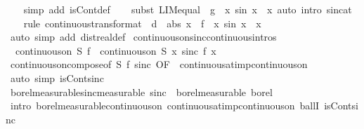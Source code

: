 \documentclass[leqno]{article}
\theoremstyle{definition}
\begin{document}
\begin{isabellebody}
\ \ \isamarkupfalse%
\ {\isacharparenleft}simp\ add{\isacharcolon}\ isCont{\isacharunderscore}def{\isacharparenright}\isanewline
\ \ \isamarkupfalse%
\ {\isacharparenleft}subst\ LIM{\isacharunderscore}equal\ {\isacharbrackleft}\ g\ {\isacharequal}\ {\isachardoublequoteopen}{\isasymlambda}x{\isachardot}\ sin\ x\ {\isacharslash}\ x{\isachardoublequoteclose}{\isacharbrackright}{\isacharcomma}\ auto\ intro{\isacharcolon}\ sinc{\isacharunderscore}at{\isacharunderscore}{}{\isacharparenright}\isanewline
\ \ \isamarkupfalse%
\ {\isacharparenleft}rule\ continuous{\isacharunderscore}transform{\isacharunderscore}at\ {\isacharbrackleft}\ d\ {\isacharequal}\ {\isachardoublequoteopen}abs\ x{\isachardoublequoteclose}\ \ f\ {\isacharequal}\ {\isachardoublequoteopen}{\isasymlambda}x{\isachardot}\ sin\ x\ {\isacharslash}\ x{\isachardoublequoteclose}{\isacharbrackright}{\isacharparenright}\isanewline
\ \ \isamarkupfalse%
\ {\isacharparenleft}auto\ simp\ add{\isacharcolon}\ dist{\isacharunderscore}real{\isacharunderscore}def{\isacharparenright}%
\isanewline
{}\isamarkupfalse%
\ continuous{\isacharunderscore}on{\isacharunderscore}sinc{\isacharbrackleft}continuous{\isacharunderscore}intros{\isacharbrackright}{\isacharcolon}\isanewline
\ \ {\isachardoublequoteopen}continuous{\isacharunderscore}on\ S\ f\ {\isasymLongrightarrow}\ continuous{\isacharunderscore}on\ S\ {\isacharparenleft}{\isasymlambda}x{\isachardot}\ sinc\ {\isacharparenleft}f\ x{\isacharparenright}{\isacharparenright}{\isachardoublequoteclose}\isanewline
{}\isamarkupfalse%
\ continuous{\isacharunderscore}on{\isacharunderscore}compose{\isacharbrackleft}of\ S\ f\ sinc{\isacharcomma}\ OF\ {\isacharunderscore}\ continuous{\isacharunderscore}at{\isacharunderscore}imp{\isacharunderscore}continuous{\isacharunderscore}on{\isacharbrackright}\isanewline
\ \ \isamarkupfalse%
\ {\isacharparenleft}auto\ simp{\isacharcolon}\ isCont{\isacharunderscore}sinc{\isacharparenright}%
\isanewline
{}\isamarkupfalse%
\ borel{\isacharunderscore}measurable{\isacharunderscore}sinc{\isacharbrackleft}measurable{\isacharbrackright}{\isacharcolon}\ {\isachardoublequoteopen}sinc\ {\isasymin}\ borel{\isacharunderscore}measurable\ borel{\isachardoublequoteclose}\isanewline
{}\isamarkupfalse%
\ {\isacharparenleft}intro\ borel{\isacharunderscore}measurable{\isacharunderscore}continuous{\isacharunderscore}on{}\ continuous{\isacharunderscore}at{\isacharunderscore}imp{\isacharunderscore}continuous{\isacharunderscore}on\ ballI\ isCont{\isacharunderscore}sinc{\isacharparenright}%

\end{isabellebody}
\end{document}
